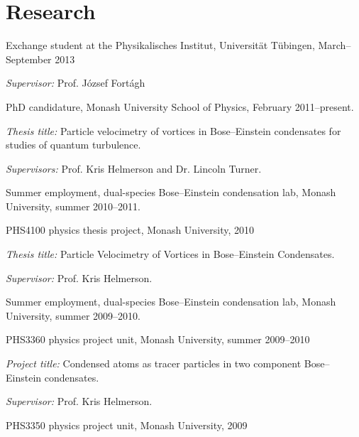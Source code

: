 \documentclass[10pt,letterpaper]{article}
\renewenvironment{itemize}{
  \begin{list}{}{
    \setlength{\leftmargin}{1.5em}
    \setlength{\itemsep}{0.25em}
    \setlength{\parskip}{0pt}
    \setlength{\parsep}{0.25em}
  }
}{
  \end{list}
}
\begin{document}
\section*{Research}
\begin{itemize}
\item{Exchange student at the Physikalisches Institut, Universität Tübingen, March–September 2013}
    \begin{itemize}
      \item \textit{Supervisor:}
      Prof. József Fortágh
    \end{itemize}
    
\item{PhD candidature, Monash University School of Physics, February 2011--present.}
    \begin{itemize}
      \item \textit{Thesis title:}
      Particle velocimetry of vortices in Bose--Einstein condensates for studies of quantum turbulence.
      \item\textit{Supervisors:}
      Prof. Kris Helmerson and Dr. Lincoln Turner.
    \end{itemize}
\item Summer employment, dual-species Bose--Einstein condensation lab, Monash University, summer 2010--2011.
\item PHS4100 physics thesis project, Monash University, 2010
    \begin{itemize}
      \item \textit{Thesis title:}
      Particle Velocimetry of Vortices in Bose--Einstein Condensates.
      \item\textit{Supervisor:}
      Prof. Kris Helmerson.
    \end{itemize}
\item Summer employment, dual-species Bose--Einstein condensation lab, Monash University, summer 2009--2010.
\item PHS3360 physics project unit, Monash University, summer 2009--2010
    \begin{itemize}
      \item \textit{Project title:}
      Condensed atoms as tracer particles in two component Bose--Einstein condensates.
      \item\textit{Supervisor:}
      Prof. Kris Helmerson.
    \end{itemize}
\item PHS3350 physics project unit, Monash University, 2009
    \begin{itemize}

\end{itemize}
\end{itemize}
\end{document}
